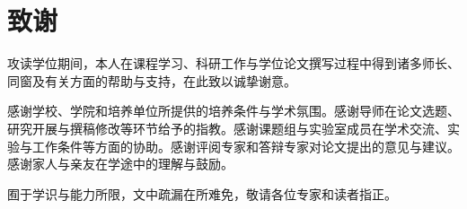 %
\chapter*{致谢}
{}
\thispagestyle{gzubody}

攻读学位期间，本人在课程学习、科研工作与学位论文撰写过程中得到诸多师长、同窗及有关方面的帮助与支持，在此致以诚挚谢意。

感谢学校、学院和培养单位所提供的培养条件与学术氛围。感谢导师在论文选题、研究开展与撰稿修改等环节给予的指教。感谢课题组与实验室成员在学术交流、实验与工作条件等方面的协助。感谢评阅专家和答辩专家对论文提出的意见与建议。感谢家人与亲友在学途中的理解与鼓励。

囿于学识与能力所限，文中疏漏在所难免，敬请各位专家和读者指正。
